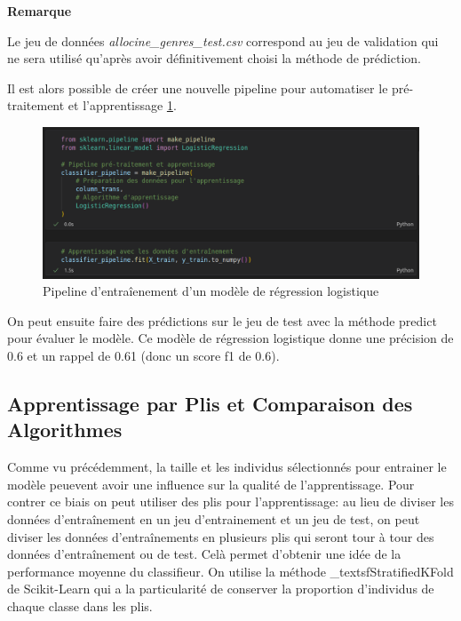 \noindent
\begin{minipage}[!hc]{0.12\textwidth}
   \textbf{Remarque}
\end{minipage}
\vrule\enskip\vrule\quad\begin{minipage}{\dimexpr 0.87\textwidth-0.8pt-1.5em}
Le jeu de données \textit{allocine\_genres\_test.csv} correspond au jeu de validation qui ne sera utilisé qu'après avoir définitivement choisi la méthode de prédiction.
\end{minipage}

Il est alors possible de créer une nouvelle pipeline pour automatiser le pré-traitement et l'apprentissage \ref{pipeline_2}.

\begin{figure}
    \center
    \includegraphics[scale=.3]{img/pipeline_2.png}
    \caption{Pipeline d'entraîenement d'un modèle de régression logistique}
    \label{pipeline_2}
\end{figure}

On peut ensuite faire des prédictions sur le jeu de test avec la méthode \textsf{predict} pour évaluer le modèle. Ce modèle de régression logistique donne une précision de 0.6 et un rappel de 0.61 (donc un score f1 de 0.6).

\subsection{Apprentissage par Plis et Comparaison des Algorithmes}
Comme vu précédemment, la taille et les individus sélectionnés pour entrainer le modèle peuevent avoir une influence sur la qualité de l'apprentissage. Pour contrer ce biais on peut utiliser des plis pour l'apprentissage: au lieu de diviser les données d'entraînement en un jeu d'entrainement et un jeu de test, on peut diviser les données d'entraînements en plusieurs plis qui seront tour à tour des données d'entraînement ou de test. Celà permet d'obtenir une idée de la performance moyenne du classifieur. On utilise la méthode _textsf{StratifiedKFold} de Scikit-Learn qui a la particularité de conserver la proportion d'individus de chaque classe dans les plis.

